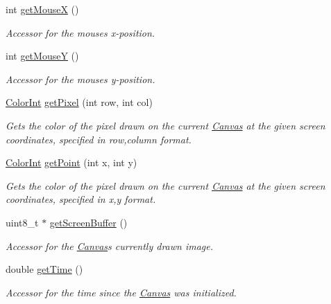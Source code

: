 \begin{DoxyCompactItemize}
int \hyperlink{classtsgl_1_1_canvas_a4af9bed83746f998474039185d2a765a}{get\+Mouse\+X} ()
\begin{DoxyCompactList}\small\item\em Accessor for the mouse\textquotesingle{}s x-\/position. \end{DoxyCompactList}\item 
int \hyperlink{classtsgl_1_1_canvas_a7fc8592848aaa14c3ff440d0ed3c9e4f}{get\+Mouse\+Y} ()
\begin{DoxyCompactList}\small\item\em Accessor for the mouse\textquotesingle{}s y-\/position. \end{DoxyCompactList}\item 
\hyperlink{structtsgl_1_1_color_int}{Color\+Int} \hyperlink{classtsgl_1_1_canvas_a1f54dba4b09d248e2611f3409353c2c6}{get\+Pixel} (int row, int col)
\begin{DoxyCompactList}\small\item\em Gets the color of the pixel drawn on the current \hyperlink{classtsgl_1_1_canvas}{Canvas} at the given screen coordinates, specified in row,column format. \end{DoxyCompactList}\item 
\hyperlink{structtsgl_1_1_color_int}{Color\+Int} \hyperlink{classtsgl_1_1_canvas_aa31883b3c9b09006cf82b270ad7a0a9f}{get\+Point} (int x, int y)
\begin{DoxyCompactList}\small\item\em Gets the color of the pixel drawn on the current \hyperlink{classtsgl_1_1_canvas}{Canvas} at the given screen coordinates, specified in x,y format. \end{DoxyCompactList}\item 
uint8\+\_\+t $\ast$ \hyperlink{classtsgl_1_1_canvas_a71f072dd82ca3b5cecfd65cde6d8a226}{get\+Screen\+Buffer} ()
\begin{DoxyCompactList}\small\item\em Accessor for the \hyperlink{classtsgl_1_1_canvas}{Canvas}\textquotesingle{}s currently drawn image. \end{DoxyCompactList}\item 
double \hyperlink{classtsgl_1_1_canvas_aef462ab48e59571b9c88076bbdc8f0b3}{get\+Time} ()
\begin{DoxyCompactList}\small\item\em Accessor for the time since the \hyperlink{classtsgl_1_1_canvas}{Canvas} was initialized. \end{DoxyCompactList}\item 

\end{DoxyCompactItemize}
